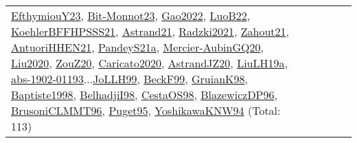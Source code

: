{\begin{longtable}{p{3cm}r>{\raggedright\arraybackslash}p{6cm}>{\raggedright\arraybackslash}p{6cm}>{\raggedright\arraybackslash}p{8cm}}
\hyperref[detail:EfthymiouY23]{EfthymiouY23}, \hyperref[detail:Bit-Monnot23]{Bit-Monnot23}, \hyperref[detail:Gao2022]{Gao2022}, \hyperref[detail:LuoB22]{LuoB22}, \hyperref[detail:KoehlerBFFHPSSS21]{KoehlerBFFHPSSS21}, \hyperref[detail:Astrand21]{Astrand21}, \hyperref[detail:Radzki2021]{Radzki2021}, \hyperref[detail:Zahout21]{Zahout21}, \hyperref[detail:AntuoriHHEN21]{AntuoriHHEN21}, \hyperref[detail:PandeyS21a]{PandeyS21a}, \hyperref[detail:Mercier-AubinGQ20]{Mercier-AubinGQ20}, \hyperref[detail:Liu2020]{Liu2020}, \hyperref[detail:ZouZ20]{ZouZ20}, \hyperref[detail:Caricato2020]{Caricato2020}, \hyperref[detail:AstrandJZ20]{AstrandJZ20}, \hyperref[detail:LiuLH19a]{LiuLH19a}, \hyperref[detail:abs-1902-01193]{abs-1902-01193}...\hyperref[detail:JoLLH99]{JoLLH99}, \hyperref[detail:BeckF99]{BeckF99}, \hyperref[detail:GruianK98]{GruianK98}, \hyperref[detail:Baptiste1998]{Baptiste1998}, \hyperref[detail:BelhadjiI98]{BelhadjiI98}, \hyperref[detail:CestaOS98]{CestaOS98}, \hyperref[detail:BlazewiczDP96]{BlazewiczDP96}, \hyperref[detail:BrusoniCLMMT96]{BrusoniCLMMT96}, \hyperref[detail:Puget95]{Puget95}, \hyperref[detail:YoshikawaKNW94]{YoshikawaKNW94} (Total: 113)\\

\end{longtable}}
